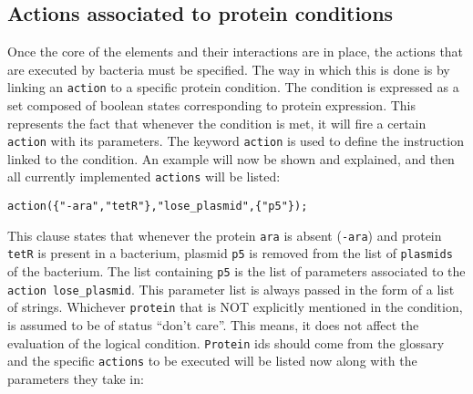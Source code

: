 \documentclass[10pt,a4paper]{article}
\begin{document}
\subsection{Actions associated to protein conditions}

Once the core of the elements and their interactions are in place, the actions that are executed by bacteria must be specified. The way in which this is done is by linking an \texttt{action} to a specific protein condition. The condition is expressed as a set composed of boolean states corresponding to protein expression. This represents the fact that whenever the condition is met, it will fire a certain \texttt{action} with its parameters. The keyword \texttt{action} is used to define the
instruction linked to the condition. An example will now be shown and explained, and then all currently implemented \texttt{actions} will be listed:

\begin{Verbatim}[obeytabs]
action({"-ara","tetR"},"lose_plasmid",{"p5"});
\end{Verbatim}

This clause states that whenever the protein \texttt{ara} is absent (\texttt{-ara}) and protein \texttt{tetR} is present in a bacterium, plasmid \texttt{p5} is removed from the list of \texttt{plasmids} of the bacterium. The list containing \texttt{p5} is the list of parameters associated to the \texttt{action lose\_plasmid}. This parameter list is always passed in the form of a list of strings. Whichever \texttt{protein} that is NOT explicitly mentioned in the condition, is assumed to be of status ``don’t care''. This means, it does not affect the evaluation of the logical condition. \texttt{Protein} ids should come from the glossary and the specific \texttt{actions} to be executed will be listed now along with the parameters they take in:
\end{document}
